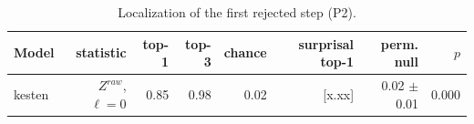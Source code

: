 \begin{table}[t]
\centering
\begin{tabular}{lrrrrrrr}
\toprule
Model & statistic & top-1 & top-3 & chance & surprisal top-1 & perm. null & $p$ \\
\midrule
kesten & $Z^{raw}$, $\ell=0$ & 0.85 & 0.98 & 0.02 & [x.xx] & 0.02 $\pm$ 0.01 & 0.000 \\
\bottomrule
\end{tabular}
\caption{Localization of the first rejected step (P2).}
\label{tab:table2-kesten-p0.05}
\end{table}
